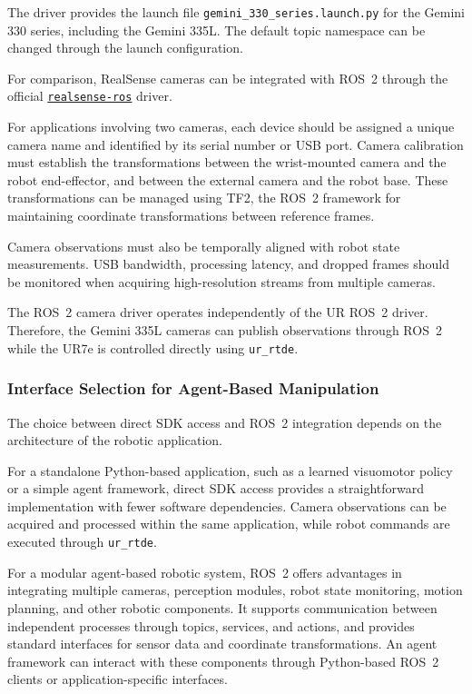 \documentclass[11pt,a4paper]{article}
\begin{document}
The driver provides the launch file \texttt{gemini\_330\_series.launch.py} for the Gemini 330 series, including the Gemini 335L. The default topic namespace can be changed through the launch configuration.

For comparison, RealSense cameras can be integrated with ROS~2 through the official \href{https://github.com/realsenseai/realsense-ros}{\texttt{realsense-ros}} driver.

For applications involving two cameras, each device should be assigned a unique camera name and identified by its serial number or USB port. Camera calibration must establish the transformations between the wrist-mounted camera and the robot end-effector, and between the external camera and the robot base. These transformations can be managed using TF2, the ROS~2 framework for maintaining coordinate transformations between reference frames.

Camera observations must also be temporally aligned with robot state measurements. USB bandwidth, processing latency, and dropped frames should be monitored when acquiring high-resolution streams from multiple cameras.

The ROS~2 camera driver operates independently of the UR ROS~2 driver. Therefore, the Gemini 335L cameras can publish observations through ROS~2 while the UR7e is controlled directly using \texttt{ur\_rtde}.

\subsubsection{Interface Selection for Agent-Based Manipulation}

The choice between direct SDK access and ROS~2 integration depends on the architecture of the robotic application.

For a standalone Python-based application, such as a learned visuomotor policy or a simple agent framework, direct SDK access provides a straightforward implementation with fewer software dependencies. Camera observations can be acquired and processed within the same application, while robot commands are executed through \texttt{ur\_rtde}.

For a modular agent-based robotic system, ROS~2 offers advantages in integrating multiple cameras, perception modules, robot state monitoring, motion planning, and other robotic components. It supports communication between independent processes through topics, services, and actions, and provides standard interfaces for sensor data and coordinate transformations. An agent framework can interact with these components through Python-based ROS~2 clients or application-specific interfaces.
\end{document}
